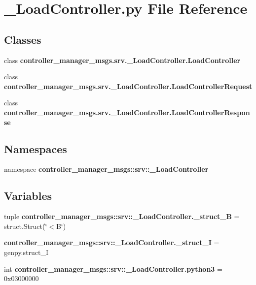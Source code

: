 \section{\-\_\-\-Load\-Controller.\-py \-File \-Reference}
\label{__LoadController_8py}
\subsection*{\-Classes}
\begin{DoxyCompactItemize}
\item 
class {\bf controller\-\_\-manager\-\_\-msgs.\-srv.\-\_\-\-Load\-Controller.\-Load\-Controller}
\item 
class {\bf controller\-\_\-manager\-\_\-msgs.\-srv.\-\_\-\-Load\-Controller.\-Load\-Controller\-Request}
\item 
class {\bf controller\-\_\-manager\-\_\-msgs.\-srv.\-\_\-\-Load\-Controller.\-Load\-Controller\-Response}
\end{DoxyCompactItemize}
\subsection*{\-Namespaces}
\begin{DoxyCompactItemize}
\item 
namespace {\bf controller\-\_\-manager\-\_\-msgs\-::srv\-::\-\_\-\-Load\-Controller}
\end{DoxyCompactItemize}
\subsection*{\-Variables}
\begin{DoxyCompactItemize}
\item 
tuple {\bf controller\-\_\-manager\-\_\-msgs\-::srv\-::\-\_\-\-Load\-Controller.\-\_\-struct\-\_\-\-B} = struct.\-Struct(\char`\"{}$<$\-B\char`\"{})
\item 
{\bf controller\-\_\-manager\-\_\-msgs\-::srv\-::\-\_\-\-Load\-Controller.\-\_\-struct\-\_\-\-I} = genpy.\-struct\-\_\-\-I
\item 
int {\bf controller\-\_\-manager\-\_\-msgs\-::srv\-::\-\_\-\-Load\-Controller.\-python3} = 0x03000000
\end{DoxyCompactItemize}
